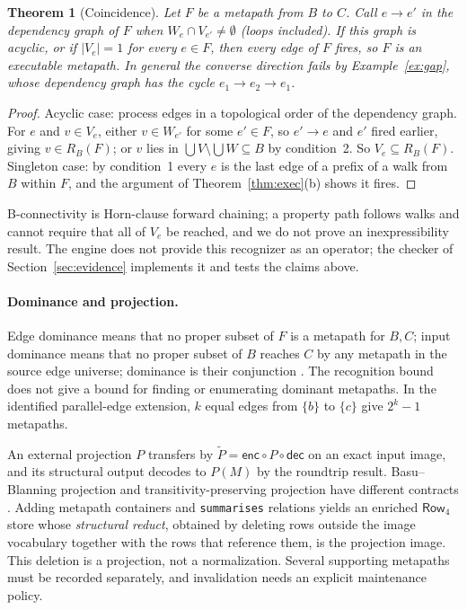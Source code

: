 \documentclass[11pt]{article}
\theoremstyle{plain}
\newtheorem{theorem}{Theorem}
\theoremstyle{definition}
\theoremstyle{remark}
\newcommand{\enc}{\mathsf{enc}}
\newcommand{\dec}{\mathsf{dec}}
\newcommand{\iri}[1]{\texttt{#1}}
\newcommand{\NF}[1]{\mathsf{Row}_{#1}}
\begin{document}
\begin{theorem}[Coincidence]\label{thm:coincide}
Let $F$ be a metapath from $B$ to $C$. Call $e\to e'$ in the \emph{dependency graph} of $F$
when $W_e\cap V_{e'}\neq\emptyset$ (loops included). If this graph is acyclic, or if
$|V_e|=1$ for every $e\in F$, then every edge of $F$ fires, so $F$ is an executable metapath.
In general the converse direction fails by Example~\ref{ex:gap}, whose dependency graph
has the cycle $e_1\to e_2\to e_1$.
\end{theorem}
\begin{proof}
Acyclic case: process edges in a topological order of the dependency graph. For $e$ and
$v\in V_e$, either $v\in W_{e'}$ for some $e'\in F$, so $e'\to e$ and $e'$ fired
earlier, giving $v\in R_B(F)$; or $v$ lies in $\bigcup V\setminus\bigcup W\subseteq B$ by
condition~2. So $V_e\subseteq R_B(F)$. Singleton case: by condition~1 every $e$ is the last
edge of a prefix of a walk from $B$ within $F$, and the argument of
Theorem~\ref{thm:exec}(b) shows it fires.
\end{proof}
B-connectivity is Horn-clause forward chaining; a property path follows walks and cannot
require that all of $V_e$ be reached, and we do not prove an inexpressibility result. The
engine does not provide this recognizer as an operator; the checker of
Section~\ref{sec:evidence} implements it and tests the claims above.

\paragraph{Dominance and projection.}
Edge dominance means that no proper subset of $F$ is a metapath for $B,C$; input dominance
means that no proper subset of $B$ reaches $C$ by any metapath in the source edge universe;
dominance is their conjunction \cite{parsonage2025tpp}. The recognition bound does not give
a bound for finding or enumerating dominant metapaths. In the identified parallel-edge
extension, $k$ equal edges from $\{b\}$ to $\{c\}$ give $2^k-1$ metapaths.

An external projection $P$ transfers by $\widetilde P=\enc\circ P\circ\dec$ on an exact
input image, and its structural output decodes to $P(M)$ by the roundtrip result.
Basu--Blanning projection and transitivity-preserving projection have different contracts
\cite{basu2007metagraphs,parsonage2025tpp}. Adding metapath containers and
\iri{summarises} relations yields an enriched $\NF4$ store whose \emph{structural
reduct}, obtained by deleting rows outside the image vocabulary together with the rows
that reference them, is the projection image. This deletion is a projection, not a
normalization. Several supporting metapaths must be recorded separately, and
invalidation needs an explicit maintenance policy.
\end{document}
